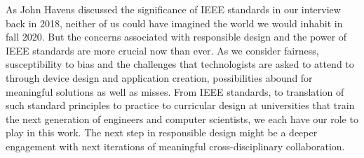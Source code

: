 \documentclass[11pt,dvipdfm]{article}
\begin{document}
As John Havens discussed the significance of IEEE standards in our interview back in 2018, neither of us could have imagined the world we would inhabit in fall 2020.  But the concerns associated with responsible design and the power of IEEE standards are more crucial now than ever.  As we consider fairness, susceptibility to bias and the challenges that technologists are asked to attend to through device design and application creation, possibilities abound for meaningful solutions as well as misses.  From IEEE standards, to translation of such standard principles to practice to curricular design at universities that train the next generation of engineers and computer scientists, we each have our role to play in this work.  The next step in responsible design might be a deeper engagement with next iterations of meaningful cross-disciplinary collaboration.
\end{document}
